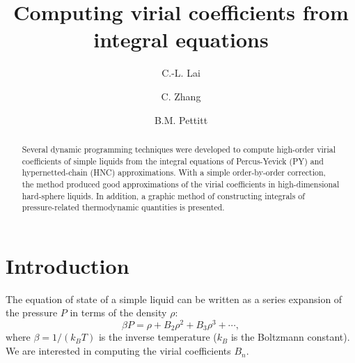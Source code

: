 \documentclass[aip,jcp,reprint,superscriptaddress]{revtex4-1}
\begin{document}
\title{Computing virial coefficients from integral equations}

\author{C.-L. Lai}
\author{C. Zhang}
\author{B.M. Pettitt}

\begin{abstract}
Several dynamic programming techniques were developed
  to compute high-order virial coefficients of simple liquids
  from the integral equations
  of Percus-Yevick (PY) and hypernetted-chain (HNC) approximations.
%
With a simple order-by-order correction,
  the method produced
  good approximations of the virial coefficients in
  high-dimensional hard-sphere liquids.
%
In addition, a graphic method of constructing integrals of
  pressure-related thermodynamic quantities
  is presented.
\end{abstract}
\maketitle






\section{Introduction}

The equation of state of a simple liquid
  can be written as a series expansion of
  the pressure $P$ in terms of the density $\rho$:
%
\begin{equation}
  \beta P = \rho + B_2 \rho^2 + B_3 \rho^3 + \cdots,
\label{eq:virial}
\end{equation}
%
where $\beta = 1/(k_B T)$ is the inverse temperature
 ($k_B$ is the Boltzmann constant).
%
We are interested in computing the virial coefficients $B_n$.
\end{document}
